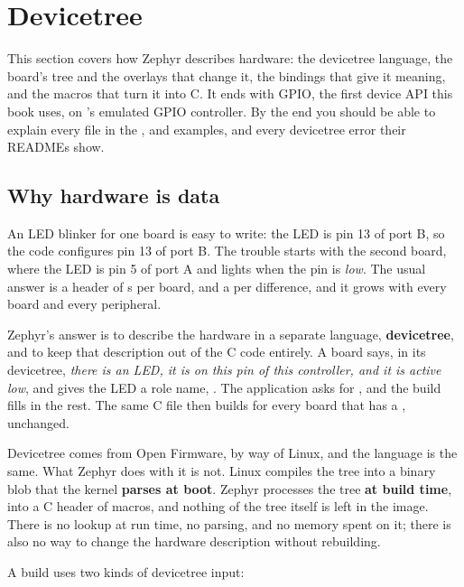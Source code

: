 
\section{Devicetree}
\label{c2:sec:devicetree}\label{c2:app:a}
This section covers how Zephyr describes hardware: the devicetree language, the board’s tree and the
overlays that change it, the bindings that give it meaning, and the macros that turn it into C. It
ends with GPIO, the first device API this book uses, on ’s emulated GPIO
controller. By the end you should be able to explain every file in the
,  and
 examples, and every devicetree error their READMEs show.

\subsection{Why hardware is data}
An LED blinker for one board is easy to write: the LED is pin 13 of port B, so the code configures
pin 13 of port B. The trouble starts with the second board, where the LED is pin 5 of port A and
lights when the pin is \emph{low}. The usual answer is a header of s per board, and a
 per difference, and it grows with every board and every peripheral.

Zephyr’s answer is to describe the hardware in a separate language, \textbf{devicetree}, and to keep
that description out of the C code entirely. A board says, in its devicetree, \emph{there is an LED,
it is on this pin of this controller, and it is active low}, and gives the LED a role name,
. The application asks for , and the build fills in the rest. The same C file
then builds for every board that has a , unchanged.

Devicetree comes from Open Firmware, by way of Linux, and the language is the same. What Zephyr does
with it is not. Linux compiles the tree into a binary blob that the kernel \textbf{parses at boot}.
Zephyr processes the tree \textbf{at build time}, into a C header of macros, and nothing of the tree
itself is left in the image. There is no lookup at run time, no parsing, and no memory spent on it;
there is also no way to change the hardware description without rebuilding.

A build uses two kinds of devicetree input:

